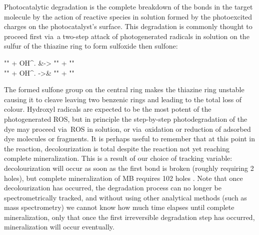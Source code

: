 \documentclass[draft,webedition,openright,titles,swedish,english]{LuaUUThesis}\usepackage[]{graphicx}\usepackage[]{xcolor}
\makeatletter
\newcommand{\via}{via}
\newenvironment{subreactions}{%
   \refstepcounter{reaction}%
   \protected@edef\theparentequation{\thereaction}%
   \setcounter{parentequation}{\value{reaction}}%
   \setcounter{reaction}{0}%
   \def\thereaction{\theparentequation\alph{reaction}}%
   \ignorespaces
}{%
   \setcounter{reaction}{\value{parentequation}}%
   \ignorespacesafterend
}
\renewcommand*\printatom[1]{\ensuremath{\mathsf{#1}}}
\makeatother
\begin{document}
Photocatalytic degradation is the complete breakdown of the bonds in the target molecule
by the action of reactive species in solution formed by the photoexcited charges
on the photocatalyst's surface.
This degradation is commonly thought to proceed first \via\ a two-step attack of photogenerated
 radicals in solution on the sulfur of the thiazine ring to form
sulfoxide then sulfone:
\renewcommand*\printatom[1]{\ensuremath{\mathrm{#1}}}
\begin{subreactions}\begin{reactions}%
"" + OH^. &-> "" + \proton{}  "\label{rxn:PC-MB-sulfoxide}" \\%
"" + OH^. ->&  "" + \proton{}  "\label{rxn:PC-MB-sulfone}"%
\end{reactions}\end{subreactions}%
\renewcommand*\printatom[1]{\ensuremath{\mathsf{#1}}}
The formed sulfone group on the central ring makes the thiazine ring unstable causing it to
cleave leaving two benzenic rings and leading to the total loss of colour.
Hydroxyl radicals are expected to be the most potent of the photogenerated \gls{ROS},
but in principle the step-by-step photodegradation of the dye may proceed \via\ \gls{ROS}
in solution, or \via\ oxidation or reduction of adsorbed dye molecules or fragments.
It is perhaps useful to remember that at this point in the reaction, decolourization is total
despite the reaction not yet reaching complete mineralization. This is a result of our
choice of tracking variable: decolourization will occur as soon as the first bond is broken
(roughly requiring 2 holes), but complete mineralization of \gls{MB} requires
\num{102} holes \cite{Mills1999}.
Note that once decolourization has occurred, the degradation process can no longer
be spectrometrically tracked, and without using other analytical methods (such as
mass spectrometry) we cannot know how much time elapses until complete mineralization,
only that once the first irreversible degradation step has occurred,
mineralization will occur eventually.
\end{document}
